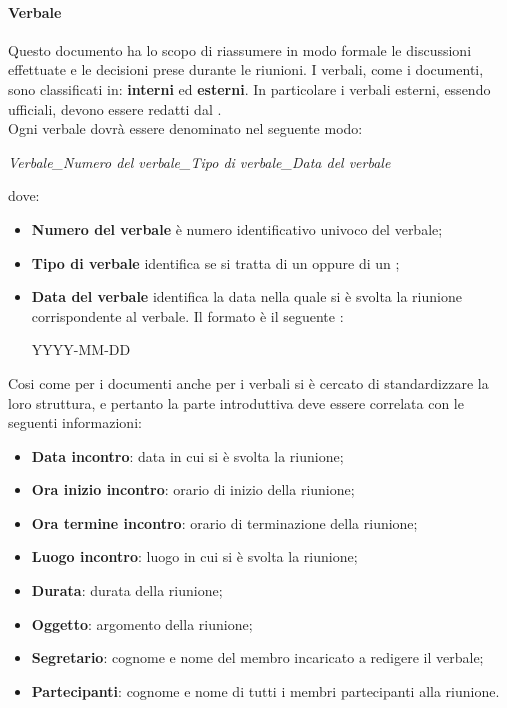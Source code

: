 \paragraph{Verbale}
Questo documento ha lo scopo di riassumere in modo formale le discussioni effettuate e le decisioni prese durante le riunioni. I verbali, come i documenti, sono classificati in:
\textbf{interni} ed \textbf{esterni}. In particolare i verbali esterni, essendo ufficiali, devono essere redatti dal \Pm. \\
Ogni verbale dovrà essere denominato nel seguente modo:
\begin{center}
  \textit{{Verbale}\_{Numero del verbale}\_{Tipo di verbale}\_{Data del verbale}}
\end{center}
dove:
\begin{itemize}
  \item \textbf{Numero del verbale} è numero identificativo univoco del verbale;
  \item \textbf{Tipo di verbale} identifica se si tratta di un \textit{\VI} oppure di un \textit{\VE};
  \item \textbf{Data del verbale} identifica la data nella quale si è svolta la
  riunione corrispondente al verbale. Il formato è il seguente :
  \begin{center}
  YYYY-MM-DD
  \end{center}
\end{itemize}
Cosi come per i documenti anche per i verbali si è cercato di standardizzare la loro struttura, e pertanto la  parte introduttiva deve essere correlata con le seguenti informazioni:
\begin{itemize}
  \item \textbf{Data incontro}: data in cui si è svolta la riunione;
  \item \textbf{Ora inizio incontro}: orario di inizio della riunione;
  \item \textbf{Ora termine incontro}: orario di terminazione della riunione;
  \item \textbf{Luogo incontro}: luogo in cui si è svolta la riunione;
  \item \textbf{Durata}: durata della riunione;
  \item \textbf{Oggetto}: argomento della riunione;
  \item \textbf{Segretario}: cognome e nome del membro incaricato a redigere il
  verbale;
  \item \textbf{Partecipanti}: cognome e nome di tutti i membri partecipanti
  alla riunione.
\end{itemize}

